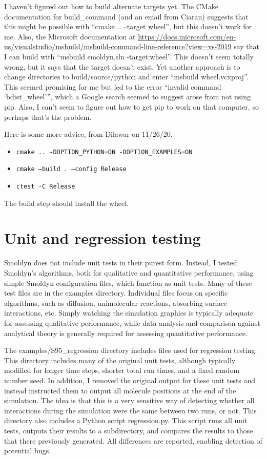 \documentclass {scrbook}
\newcommand {\ttt} {\texttt}
\begin{document}
I haven't figured out how to build alternate targets yet. The CMake documentation for build\_command (and an email from Ciaran) suggests that this might be possible with ``cmake .. --target wheel'', but this doesn't work for me. Also, the Microsoft documentation at \url{https://docs.microsoft.com/en-us/visualstudio/msbuild/msbuild-command-line-reference?view=vs-2019} say that I can build with ``msbuild smoldyn.sln -target:wheel''. This doesn't seem totally wrong, but it says that the target doesn't exist. Yet another approach is to change directories to build/source/python and enter ``msbuild wheel.vcxproj''. This seemed promising for me but led to the error ``invalid command `bdist\_wheel''', which a Google search seemed to suggest arose from not using pip. Also, I can't seem to figure out how to get pip to work on that computer, so perhaps that's the problem.

Here is some more advice, from Dilawar on 11/26/20.
\begin{itemize}
\item \ttt{cmake .. -DOPTION\_PYTHON=ON -DOPTION\_EXAMPLES=ON}
\item \ttt{cmake --build . --config Release}
\item \ttt{ctest -C Release}
\end{itemize}
The build step should install the wheel.


\section{Unit and regression testing}

Smoldyn does not include unit tests in their purest form. Instead, I tested Smoldyn's algorithms, both for qualitative and quantitative performance, using simple Smoldyn configuration files, which function as unit tests. Many of these test files are in the examples directory. Individual files focus on specific algorithms, such as diffusion, unimolecular reactions, absorbing surface interactions, etc. Simply watching the simulation graphics is typically adequate for assessing qualitative performance, while data analysis and comparison against analytical theory is generally required for assessing quantitative performance.

The examples/S95\_regression directory includes files used for regression testing. This directory includes many of the original unit tests, although typically modified for longer time steps, shorter total run times, and a fixed random number seed. In addition, I removed the original output for these unit tests and instead instructed them to output all molecule positions at the end of the simulation. The idea is that this is a very sensitive way of detecting whether all interactions during the simulation were the same between two runs, or not. This directory also includes a Python script regression.py. This script runs all unit tests, outputs their results to a subdirectory, and compares the results to those that there previously generated. All differences are reported, enabling detection of potential bugs.
\end{document}

